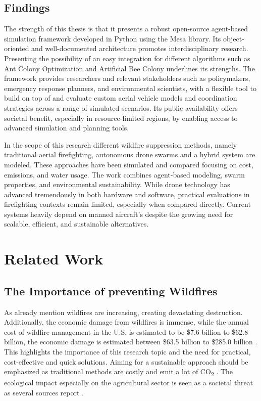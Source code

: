 \documentclass[11pt, a4paper]{article}
\begin{document}
\subsection{Findings}


The strength of this thesis is that it presents a robust open-source agent-based simulation framework developed in Python using the Mesa library. Its object-oriented and well-documented architecture promotes interdisciplinary research. Presenting the possibility of an easy integration for different algorithms such as Ant Colony Optimization and Artificial Bee Colony underlines its strengths. The framework provides researchers and relevant stakeholders such as policymakers, emergency response planners, and environmental scientists, with a flexible tool to build on top of and evaluate custom aerial vehicle models and coordination strategies across a range of simulated scenarios. Its public availability offers societal benefit, especially in resource-limited regions, by enabling access to advanced simulation and planning tools.


In the scope of this research different wildfire suppression methods, namely traditional aerial firefighting, autonomous drone swarms and a hybrid system are modeled. These approaches have been simulated and compared focusing on cost, emissions, and water usage. The work combines agent-based modeling, swarm properties, and environmental sustainability. While drone technology has advanced tremendously in both hardware and software, practical evaluations in firefighting contexts remain limited, especially when compared directly. Current systems heavily depend on manned aircraft's despite the growing need for scalable, efficient, and sustainable alternatives.


\section{Related Work}

\subsection{The Importance of preventing Wildfires}
As already mention wildfires are increasing, creating devastating destruction. Additionally, the economic damage from wildfires is immense, while the annual cost of wildfire management in the U.S. is estimated to be \$7.6 billion to \$62.8 billion, the economic damage is estimated between \$63.5 billion to \$285.0 billion \cite{Afghah2019}. This highlights the importance of this research topic and the need for practical, cost-effective and quick solutions. Aiming for a sustainable approach should be emphasized as traditional methods are costly and emit a lot of CO\textsubscript{2} \cite{Saffre2022}. The ecological impact especially on the agricultural sector is seen as a societal threat as several sources report \citep{grassland_Wildfires,IPCC2023}. 
\end{document}
